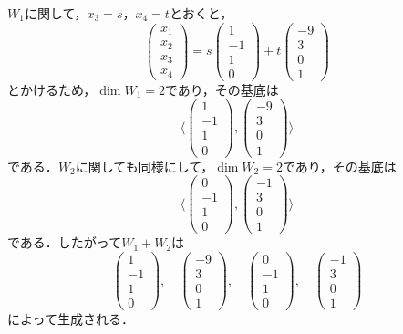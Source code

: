 \documentclass[a4paper,10pt,fleqn]{ltjsarticle}
\begin{document}
\begin{tleftbar}
    $ W_1$に関して，$x_3 =s$，$x_4 =t$とおくと，
    \[
        \begin{pmatrix} x_1 \\ x_2 \\ x_3 \\ x_4 \end{pmatrix} = s \begin{pmatrix} 1 \\ -1 \\ 1 \\ 0 \end{pmatrix} + t \begin{pmatrix} -9 \\ 3 \\ 0 \\ 1 \end{pmatrix}
    \]
    とかけるため，$\dim W_1 = 2$であり，その基底は
    \[
        \langle  \begin{pmatrix} 1 \\ -1 \\ 1 \\ 0 \end{pmatrix} , \begin{pmatrix} -9 \\ 3 \\ 0 \\ 1 \end{pmatrix} \rangle
    \]
    である．$W_2$に関しても同様にして，$\dim W_2 = 2$であり，その基底は
    \[
        \langle \begin{pmatrix} 0 \\ -1 \\ 1 \\ 0 \end{pmatrix} , \begin{pmatrix} -1 \\ 3 \\ 0 \\ 1 \end{pmatrix} \rangle
    \]
    である．したがって$W_1 + W_2$は
    \[
        \begin{pmatrix} 1 \\ -1 \\ 1 \\ 0 \end{pmatrix} ,\quad  \begin{pmatrix} -9 \\ 3 \\ 0 \\ 1 \end{pmatrix},\quad \begin{pmatrix} 0 \\ -1 \\ 1 \\ 0 \end{pmatrix} ,\quad  \begin{pmatrix} -1 \\ 3 \\ 0 \\ 1 \end{pmatrix}
    \]
    によって生成される．


\end{tleftbar}
\end{document}

